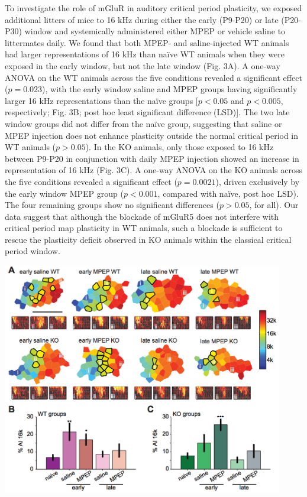 To investigate the role of mGluR in auditory critical period plasticity, we exposed additional litters of mice to 16 kHz during either the early (P9-P20) or late (P20-P30) window and systemically administered either MPEP or vehicle saline to littermates daily. We found that both MPEP- and saline-injected WT animals had larger representations of 16 kHz than na\"ive WT animals when they were exposed in the early window, but not the late window (Fig. 3A). A one-way ANOVA on the WT animals across the five conditions revealed a significant effect ($p=0.023$), with the early window saline and MPEP groups having significantly larger 16 kHz representations than the na\"ive groups [$p<0.05$ and $p<0.005$, respectively; Fig. 3B; post hoc least significant difference (LSD)]. The two late window groups did not differ from the na\"ive group, suggesting that saline or MPEP injection does not enhance plasticity outside the normal critical period in WT animals ($p>0.05$). In the KO animals, only those exposed to 16 kHz between P9-P20 in conjunction with daily MPEP injection showed an increase in representation of 16 kHz (Fig. 3C). A one-way ANOVA on the KO animals across the five conditions revealed a significant effect ($p=0.0021$), driven exclusively by the early window MPEP group ($p<0.001$, compared with na\"ive, post hoc LSD). The four remaining groups show no significant differences ($p>0.05$, for all). Our data suggest that although the blockade of mGluR5 does not interfere with critical period map plasticity in WT animals, such a blockade is sufficient to rescue the plasticity deficit observed in KO animals within the classical critical period window.

\centerline{\includegraphics[height=4in]{images/C2F3}}

